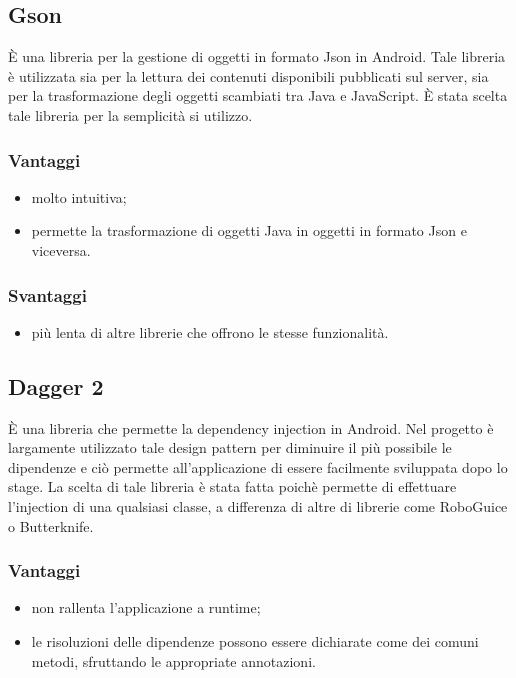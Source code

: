 \documentclass[../Tesi.tex]{subfiles}
\begin{document}
	\subsection{Gson}
		È una libreria per la gestione di oggetti in formato Json in Android. Tale libreria è utilizzata sia per la lettura dei contenuti disponibili pubblicati sul server, sia per la trasformazione degli oggetti scambiati tra Java e JavaScript. È stata scelta tale libreria per la semplicità si utilizzo.
		\subsubsection{Vantaggi}
			\begin{itemize}
				\item molto intuitiva;
				\item permette la trasformazione di oggetti Java in oggetti in formato Json e viceversa.
			\end{itemize}	
		\subsubsection{Svantaggi}
			\begin{itemize}
				\item più lenta di altre librerie che offrono le stesse funzionalità.
			\end{itemize}

	\subsection{Dagger 2}
		È una libreria che permette la dependency injection in Android. Nel progetto è largamente utilizzato tale design pattern per diminuire il più possibile le dipendenze e ciò permette all'applicazione di essere facilmente sviluppata dopo lo stage. La scelta di tale libreria è stata fatta poichè permette di effettuare l'injection di una qualsiasi classe, a differenza di altre di librerie come RoboGuice o Butterknife.
		\subsubsection{Vantaggi}
			\begin{itemize}
				\item non rallenta l'applicazione a runtime;
				\item le risoluzioni delle dipendenze possono essere dichiarate come dei comuni metodi, sfruttando le appropriate annotazioni.
			\end{itemize}
\end{document}
